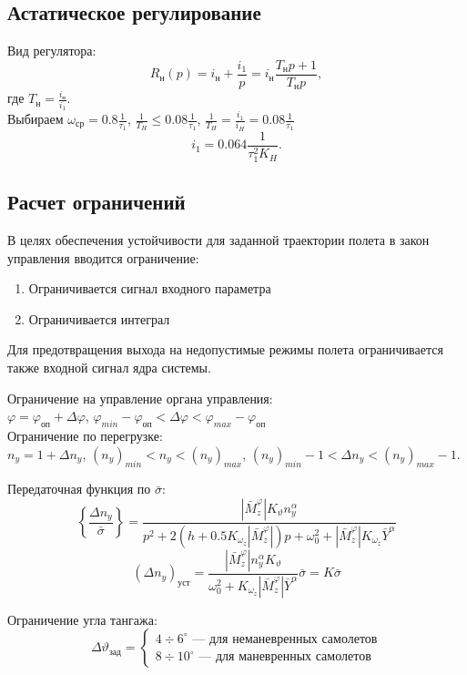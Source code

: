 \documentclass{article}
\begin{document}
\subsection{Астатическое регулирование}
Вид регулятора:
\[
	R_\text{н}(p) = i_\text{н} +\frac{i_1}{p}  = i_\text{н} \frac{T_\text{н} p
		+ 1}{T_\text{н} p},
\]
где $T_\text{н} =\frac{i_\text{н}}{i_1}$.\\
Выбираем $\omega_\text{ср} = 0.8 \frac{1}{\tau_1}$, $\frac{1}{T_H} \le
	0.08\frac{1}{\tau_1}$, $\frac{1}{T_H} = \frac{i_1}{i_H} = 0.08\frac{1}{\tau_1}$
\[
	i_1 = 0.064 \frac{1}{\tau_1^2 K_H}
	.\]

\subsection{Расчет ограничений}
В целях обеспечения устойчивости для заданной траектории полета в закон
управления вводится ограничение:
\begin{enumerate}
	\item Ограничивается сигнал входного параметра
	\item Ограничивается интеграл
\end{enumerate}

Для предотвращения выхода на недопустимые режимы полета ограничивается также
входной сигнал ядра системы.
\begin{figure}[H]
	\centering
	\label{fig:fig_54}
\end{figure}

Ограничение на управление органа управления:\\
$\varphi = \varphi_\text{оп} + \Delta \varphi$, $\varphi_{min} -
	\varphi_\text{оп} < \Delta \varphi < \varphi_{max} - \varphi_\text{оп}$\\
Ограничение по перегрузке:\\
$n_y = 1 + \Delta n_y$, $(n_y)_{min} < n_y < (n_y)_{max}$, $(n_y)_{min} - 1 <
	\Delta n_y < (n_y)_{max} - 1$.

Передаточная функция по $\bar{\sigma}$:
\[
	\left\{\frac{\Delta n_y}{\bar{\sigma}} \right\} =\frac{|\bar{M}_z^\varphi|
	K_{\vartheta} n_y^\alpha}{ p^2 + 2(h + 0.5 K_{\omega_z} |
	\bar{M}_z^{\varphi} |)p + \omega_0^2 + | \bar{M}_z^{\varphi}| K_{\omega_z}
	\bar{Y}^\alpha}
\]
\[
	\left( \Delta n_y\right)_\text{уст} = \frac{| \bar{M}_z^{\varphi}|
	n_y^\alpha K_\vartheta}{\omega_0^2 + K_{\omega_z} | \bar{M}_z^{\varphi} |
	\bar{Y}^\alpha} \bar{\sigma} = K \bar{\sigma}
\]

Ограничение угла тангажа:
\begin{equation}
	\Delta \vartheta_\text{зад} =
	\begin{cases}
		4 \div 6^\circ \text{ --- для неманевренных самолетов} \\
		8 \div 10^\circ \text{ --- для маневренных самолетов}
	\end{cases}
\end{equation}
\end{document}
